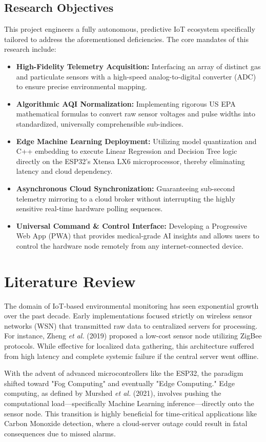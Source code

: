 \documentclass[12pt,journal,onecolumn,a4paper]{IEEEtran}
\begin{document}
\subsection{Research Objectives}
This project engineers a fully autonomous, predictive IoT ecosystem specifically tailored to address the aforementioned deficiencies. The core mandates of this research include:
\begin{itemize}
    \item \textbf{High-Fidelity Telemetry Acquisition:} Interfacing an array of distinct gas and particulate sensors with a high-speed analog-to-digital converter (ADC) to ensure precise environmental mapping.
    \item \textbf{Algorithmic AQI Normalization:} Implementing rigorous US EPA mathematical formulas to convert raw sensor voltages and pulse widths into standardized, universally comprehensible sub-indices.
    \item \textbf{Edge Machine Learning Deployment:} Utilizing model quantization and C++ embedding to execute Linear Regression and Decision Tree logic directly on the ESP32's Xtensa LX6 microprocessor, thereby eliminating latency and cloud dependency.
    \item \textbf{Asynchronous Cloud Synchronization:} Guaranteeing sub-second telemetry mirroring to a cloud broker without interrupting the highly sensitive real-time hardware polling sequences.
    \item \textbf{Universal Command \& Control Interface:} Developing a Progressive Web App (PWA) that provides medical-grade AI insights and allows users to control the hardware node remotely from any internet-connected device.
\end{itemize}

\section{Literature Review}
The domain of IoT-based environmental monitoring has seen exponential growth over the past decade. Early implementations focused strictly on wireless sensor networks (WSN) that transmitted raw data to centralized servers for processing. For instance, Zheng \textit{et al.} (2019) proposed a low-cost sensor node utilizing ZigBee protocols. While effective for localized data gathering, this architecture suffered from high latency and complete systemic failure if the central server went offline.

With the advent of advanced microcontrollers like the ESP32, the paradigm shifted toward "Fog Computing" and eventually "Edge Computing." Edge computing, as defined by Murshed \textit{et al.} (2021), involves pushing the computational load—specifically Machine Learning inference—directly onto the sensor node. This transition is highly beneficial for time-critical applications like Carbon Monoxide detection, where a cloud-server outage could result in fatal consequences due to missed alarms.
\end{document}
